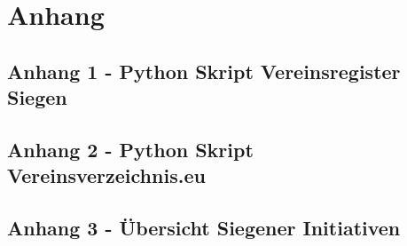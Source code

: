 \section{Anhang}
\subsection*{Anhang 1 - Python Skript Vereinsregister Siegen}


\newpage
\subsection*{Anhang 2 - Python Skript Vereinsverzeichnis.eu}



\subsection*{Anhang 3 - Übersicht Siegener Initiativen}

